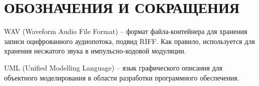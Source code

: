 \section*{ОБОЗНАЧЕНИЯ И СОКРАЩЕНИЯ}

WAV (Waveform Audio File Format) -- формат файла-контейнера для хранения записи оцифрованного аудиопотока, подвид RIFF. Как правило, используется для хранения несжатого звука в импульсно-кодовой модуляции.

UML (Unified Modelling Language) -- язык графического описания для объектного моделирования в области разработки программного обеспечения.
